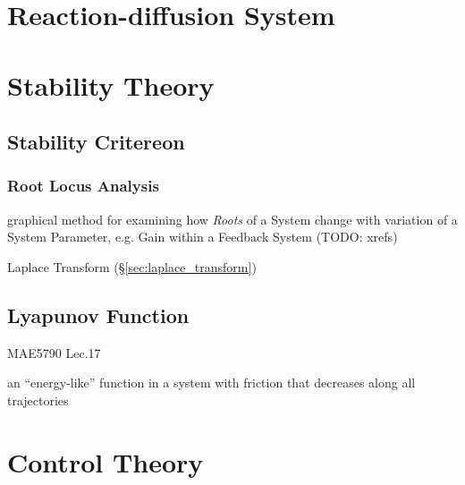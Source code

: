 \section{Reaction-diffusion System}\label{sec:reaction_diffusion}

\section{Stability Theory}\label{sec:stability_theory}

\subsection{Stability Critereon}\label{sec:stability_critereon}

\subsubsection{Root Locus Analysis}\label{sec:root_locus_analysis}

graphical method for examining how \emph{Roots} of a System change with
variation of a System Parameter, e.g. Gain within a Feedback System (TODO:
xrefs)

Laplace Transform (\S\ref{sec:laplace_transform})



\subsection{Lyapunov Function}\label{sec:lyapunov_function}

MAE5790 Lec.17

an ``energy-like'' function in a system with friction that decreases along
all trajectories



\section{Control Theory}\label{sec:control_theory}

